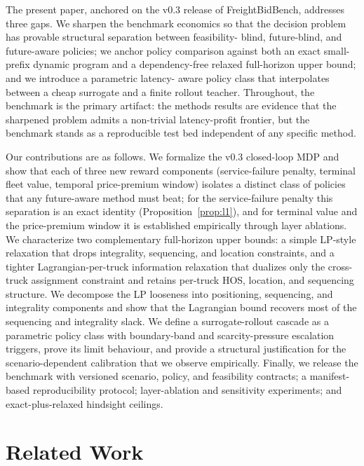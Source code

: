 \documentclass[11pt]{article}
\begin{document}
The present paper, anchored on the v0.3 release of FreightBidBench,
addresses three gaps. We sharpen the benchmark economics so that the
decision problem has provable structural separation between feasibility-
blind, future-blind, and future-aware policies; we anchor policy comparison
against both an exact small-prefix dynamic program and a dependency-free
relaxed full-horizon upper bound; and we introduce a parametric latency-
aware policy class that interpolates between a cheap surrogate and a
finite rollout teacher. Throughout, the benchmark is the primary artifact:
the methods results are evidence that the sharpened problem admits a
non-trivial latency-profit frontier, but the benchmark stands as a
reproducible test bed independent of any specific method.

Our contributions are as follows. We formalize the v0.3 closed-loop MDP and
show that each of three new reward components (service-failure penalty,
terminal fleet value, temporal price-premium window) isolates a distinct
class of policies that any future-aware method must beat; for the
service-failure penalty this separation is an exact identity
(Proposition~\ref{prop:l1}), and for terminal value and the price-premium
window it is established empirically through layer ablations. We characterize
two complementary full-horizon upper bounds: a simple LP-style
relaxation that drops integrality, sequencing, and location constraints,
and a tighter Lagrangian-per-truck information relaxation
\citep{brown2010information} that dualizes only the cross-truck
assignment constraint and retains per-truck HOS, location, and
sequencing structure. We decompose the LP looseness into positioning,
sequencing, and integrality components and show that the Lagrangian
bound recovers most of the sequencing and integrality slack. We define a
surrogate-rollout cascade as a parametric policy class with
boundary-band and scarcity-pressure escalation triggers, prove its
limit behaviour, and provide a structural justification for the
scenario-dependent calibration that we observe empirically. Finally, we release the
benchmark with versioned scenario, policy, and feasibility contracts; a
manifest-based reproducibility protocol; layer-ablation and sensitivity
experiments; and exact-plus-relaxed hindsight ceilings.

\section{Related Work}
\end{document}
